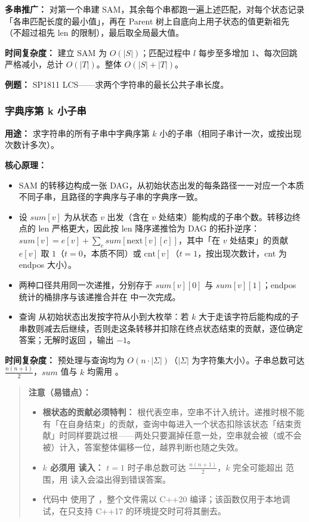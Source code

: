 \textbf{多串推广：} 对第一个串建 SAM，其余每个串都跑一遍上述匹配，对每个状态记录「各串匹配长度的最小值」，再在 Parent 树上自底向上用子状态的值更新祖先（不超过祖先 $\text{len}$ 的限制），最后取全局最大值。

\textbf{时间复杂度：} 建立 SAM 为 $O(|S|)$；匹配过程中 $l$ 每步至多增加 $1$、每次回跳严格减小，总计 $O(|T|)$。整体 $O(|S| + |T|)$。

\textbf{例题：} SP1811 LCS——求两个字符串的最长公共子串长度。



\subsubsection{字典序第 k 小子串}

\textbf{用途：} 求字符串的所有子串中字典序第 $k$ 小的子串（相同子串计一次，或按出现次数计多次）。

\textbf{核心原理：}
\begin{itemize}
  \item SAM 的转移边构成一张 DAG，从初始状态出发的每条路径一一对应一个本质不同子串，且路径的字典序与子串的字典序一致。
  \item 设 $sum[v]$ 为从状态 $v$ 出发（含在 $v$ 处结束）能构成的子串个数。转移边终点的 len 严格更大，因此按 len 降序递推恰为 DAG 的拓扑逆序：$sum[v] = e[v] + \sum_{c} sum[\text{next}[v][c]]$，其中「在 $v$ 处结束」的贡献 $e[v]$ 取 $1$（$t=0$，本质不同）或 $\text{cnt}[v]$（$t=1$，按出现次数计，cnt 为 endpos 大小）。
  \item 两种口径共用同一次递推，分别存于 $sum[v][0]$ 与 $sum[v][1]$；endpos 统计的桶排序与该递推合并在  中一次完成。
  \item 查询  从初始状态出发按字符从小到大枚举：若 $k$ 大于走该字符后能构成的子串数则减去后继续，否则走这条转移并扣除在终点状态结束的贡献，逐位确定答案；无解时返回 ，输出 $-1$。
\end{itemize}

\textbf{时间复杂度：} 预处理与查询均为 $O(n \cdot |\Sigma|)$（$|\Sigma|$ 为字符集大小）。子串总数可达 $\frac{n(n+1)}{2}$，$sum$ 值与 $k$ 均需用 。

\begin{quote}
\textbf{注意（易错点）：}
\begin{itemize}
  \item \textbf{根状态的贡献必须特判：} 根代表空串，空串不计入统计。递推时根不能有「在自身结束」的贡献，查询中每进入一个状态扣除该状态「结束贡献」时同样要跳过根——两处只要漏掉任意一处，空串就会被（或不会被）计入，答案整体偏移一位，越界判断也随之失效。
  \item \textbf{$k$ 必须用  读入：} $t=1$ 时子串总数可达 $\frac{n(n+1)}{2}$，$k$ 完全可能超出  范围，用  读入会溢出得到错误答案。
  \item 代码中  使用了 ，整个文件需以 C++20 编译；该函数仅用于本地调试，在只支持 C++17 的环境提交时可将其删去。
\end{itemize}
\end{quote}

